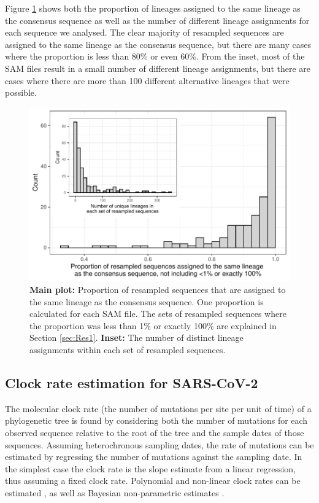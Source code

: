 \documentclass[12pt]{article}
\begin{document}
Figure \ref{fig:covidcalls2} shows both the proportion of lineages assigned to the same lineage as the consensus sequence as well as the number of different lineage assignments for each sequence we analysed.
The clear majority of resampled sequences are assigned to the same lineage as the consensus sequence, but there are many cases where the proportion is less than 80\% or even 60\%.
From the inset, most of the SAM files result in a small number of different lineage assignments, but there are cases where there are more than 100 different alternative lineages that were possible.


\begin{figure}
\centering
\includegraphics[width=0.8\linewidth]{figs/prop_correct.pdf}
\caption{\label{fig:covidcalls2}\textbf{Main {}plot:} Proportion of resampled sequences that are assigned to the same lineage as the consensus sequence.
One proportion is calculated for each SAM file.
The sets of resampled sequences where the proportion was less than 1\% or exactly 100\% are explained in Section \ref{sec:Res1}.
\textbf{Inset:} The number of distinct lineage assignments within each set of resampled sequences.}
\end{figure}



\subsection{Clock rate estimation for SARS-CoV-2}

The molecular clock rate (the number of mutations per site per unit of time) of a phylogenetic tree is found by considering both the number of mutations for each observed sequence relative to the root of the tree and the sample dates of those sequences.
Assuming heterochronous sampling dates, the rate of mutations can be estimated by regressing the number of mutations against the sampling date.
In the simplest case the clock rate is the slope estimate from a linear regression, thus assuming a fixed clock rate.
Polynomial and non-linear clock rates can be estimated \cite{sagulenkoTreeTimeMaximumlikelihoodPhylodynamic2018}, as well as Bayesian non-parametric estimates \cite{drummondBayesianEvolutionaryAnalysis2015}. 
\end{document}
